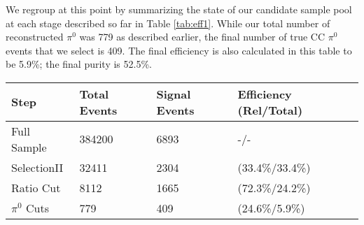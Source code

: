 \documentclass[12pt]{article}
\begin{document}
%
%
%
%
%
%


\par We regroup at this point by summarizing the state of our candidate sample pool at each stage described so far in Table \ref{tab:eff1}. While our total number of reconstructed $\pi^0$ was 779 as described earlier, the final number of true CC $\pi^0$ events that we select is 409. The final efficiency is also calculated in this table to be 5.9\%; the final purity is 52.5\%.

\vspace{3 mm}
\noindent
\begin{minipage}{\linewidth}
\centering
{} 
\label{tab:eff1} 
 \begin{tabular}{| l | l | l | l |}
 \hline
 Step & Total Events & Signal Events & Efficiency (Rel/Total) \\ \hline %
  Full Sample & 384200 & 6893  & -/- \\ \hline 
  SelectionII & 32411 & 2304 & (33.4\%/33.4\%) \\ \hline
  Ratio Cut & 8112 & 1665 & (72.3\%/24.2\%) \\ \hline
  $\pi^0$ Cuts & 779 & 409 & (24.6\%/5.9\%) \\ \hline
   \end{tabular}
\end{minipage}\\
\end{document}
